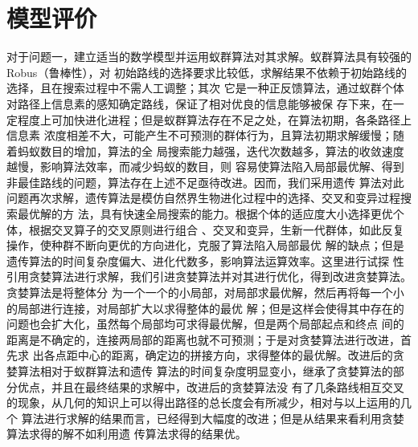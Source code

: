 \documentclass[fontset=windows,a4paper,12pt]{ctexart}
\begin{document}
    \section{模型评价}
	    对于问题一，建立适当的数学模型并运用蚁群算法对其求解。蚁群算法具有较强的Robus（鲁棒性），对
	    初始路线的选择要求比较低，求解结果不依赖于初始路线的选择，且在搜索过程中不需人工调整；其次
	    它是一种正反馈算法，通过蚁群个体对路径上信息素的感知确定路线，保证了相对优良的信息能够被保
	    存下来，在一定程度上可加快进化进程；但是蚁群算法存在不足之处，在算法初期，各条路径上信息素
	    浓度相差不大，可能产生不可预测的群体行为，且算法初期求解缓慢；随着蚂蚁数目的增加，算法的全
	    局搜索能力越强，迭代次数越多，算法的收敛速度越慢，影响算法效率，而减少蚂蚁的数目，则
	    容易使算法陷入局部最优解、得到非最佳路线的问题，算法存在上述不足亟待改进。因而，我们采用遗传
	    算法对此问题再次求解，遗传算法是模仿自然界生物进化过程中的选择、交叉和变异过程搜索最优解的方
	    法，具有快速全局搜索的能力。根据个体的适应度大小选择更优个体，根据交叉算子的交叉原则进行组合
	    、交叉和变异，生新一代群体，如此反复操作，使种群不断向更优的方向进化，克服了算法陷入局部最优
	    解的缺点；但是遗传算法的时间复杂度偏大、进化代数多，影响算法运算效率。这里进行试探
	    性引用贪婪算法进行求解，我们引进贪婪算法并对其进行优化，得到改进贪婪算法。贪婪算法是将整体分
	    为一个一个的小局部，对局部求最优解，然后再将每一个小的局部进行连接，对局部扩大以求得整体的最优
	    解；但是这样会使得其中存在的问题也会扩大化，虽然每个局部均可求得最优解，但是两个局部起点和终点
	    间的距离是不确定的，连接两局部的距离也就不可预测；于是对贪婪算法进行改进，首先求
	    出各点距中心的距离，确定边的拼接方向，求得整体的最优解。改进后的贪婪算法相对于蚁群算法和遗传
	    算法的时间复杂度明显变小，继承了贪婪算法的部分优点，并且在最终结果的求解中，改进后的贪婪算法没
	    有了几条路线相互交叉的现象，从几何的知识上可以得出路径的总长度会有所减少，相对与以上运用的几个
	    算法进行求解的结果而言，已经得到大幅度的改进；但是从结果来看利用贪婪算法求得的解不如利用遗
	    传算法求得的结果优。
  
  
\end{document}
